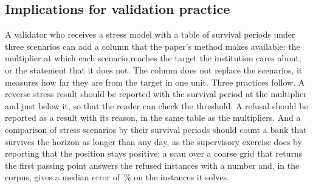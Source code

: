 \subsection{Implications for validation practice}

A validator who receives a stress model with a table of survival periods under three scenarios can add a column that the paper's method makes available: the multiplier at which each scenario reaches the target the institution cares about, or the statement that it does not. The column does not replace the scenarios, it measures how far they are from the target in one unit. Three practices follow. A reverse stress result should be reported with the survival period at the multiplier and just below it, so that the reader can check the threshold. A refusal should be reported as a result with its reason, in the same table as the multipliers. And a comparison of stress scenarios by their survival periods should count a bank that survives the horizon as longer than any day, as the supervisory exercise does by reporting that the position stays positive; a scan over a coarse grid that returns the first passing point answers the refused instances with a number and, in the corpus, gives a median error of \kGErrPc{}\,\% on the instances it solves.
